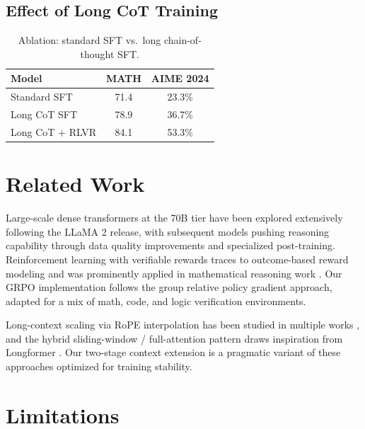 \documentclass[11pt,a4paper]{article}
\begin{document}
\subsection{Effect of Long CoT Training}

\begin{table}[H]
\centering
\caption{Ablation: standard SFT vs.\ long chain-of-thought SFT.}
\label{tab:cot_ablation}
\begin{tabular}{lcc}
\toprule
\textbf{Model} & \textbf{MATH} & \textbf{AIME 2024} \\
\midrule
Standard SFT      & 71.4 & 23.3\% \\
Long CoT SFT      & 78.9 & 36.7\% \\
Long CoT + RLVR   & 84.1 & 53.3\% \\
\bottomrule
\end{tabular}
\end{table}

\section{Related Work}

Large-scale dense transformers at the 70B tier have been explored extensively following the
LLaMA 2 \cite{touvron2023llama2} release, with subsequent models pushing reasoning capability
through data quality improvements and specialized post-training. Reinforcement learning with
verifiable rewards traces to outcome-based reward modeling \cite{cobbe2021gsm8k} and was
prominently applied in mathematical reasoning work \cite{lightman2023lets, shao2024deepseekmath}.
Our GRPO implementation follows the group relative policy gradient approach, adapted for a mix
of math, code, and logic verification environments.

Long-context scaling via RoPE interpolation has been studied in multiple works
\cite{peng2023yarn, chen2023extending}, and the hybrid sliding-window / full-attention pattern
draws inspiration from Longformer \cite{beltagy2020longformer}. Our two-stage context extension
is a pragmatic variant of these approaches optimized for training stability.

\section{Limitations}
\end{document}
